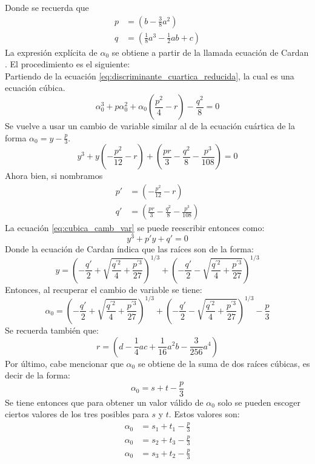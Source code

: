 \documentclass[12pt]{article}
\begin{document}
Donde se recuerda que 
\begin{align}
\label{eq:valores_p_cuartica}
p&=\left(b-\frac{3}{8}a^2\right)\\
\label{eq:valores_q_cuartica}
q&=\left(\frac{1}{8}a^3 - \frac{1}{2}ab + c \right)
\end{align}
La expresión explícita de $\alpha_0$ se obtiene a partir de la llamada ecuación de Cardan \cite{higheralgebra}. El procedimiento es el siguiente:\\
Partiendo de la ecuación \ref{eq:discriminante_cuartica_reducida}, la cual es una ecuación cúbica.
\begin{equation}
\alpha_0^3 + p\alpha_0^2+ \alpha_0 \left(\frac{p^2}{4}-r\right) - \frac{q^2}{8}=0
\end{equation}
Se vuelve a usar un cambio de variable similar al de la ecuación cuártica de la forma $\alpha_0 = y- \frac{p}{3}$.
\begin{equation}
\label{eq:cubica_camb_var}
y^3 +y\left(-\frac{p^2}{12}-r\right) + \left(\frac{pr}{3}-\frac{q^2}{8}-\frac{p^3}{108}\right)=0
\end{equation}
Ahora bien, si nombramos
\begin{align}
\label{eq:pp_alpha}
p'&=\left(-\frac{p^2}{12}-r\right)\\
\label{eq:qp_alpha}
q'&=\left(\frac{pr}{3}-\frac{q^2}{8}-\frac{p^3}{108}\right)
\end{align}
La ecuación \ref{eq:cubica_camb_var} se puede reescribir entonces como:
\begin{equation}
\label{eq:cub_red}
y^3 +p'y+q'=0
\end{equation}
Donde la ecuación de Cardan \cite{higheralgebra} índica que las raíces son de la forma:
\begin{equation}
y = \left(-\frac{q'}{2} + \sqrt{\frac{q^{'2}}{4}+\frac{p^{'3}}{27}}\right)^{1/3} + \left(-\frac{q'}{2} - \sqrt{\frac{q^{'2}}{4}+\frac{p^{'3}}{27}}\right)^{1/3}
\end{equation}
Entonces, al recuperar el cambio de variable se tiene:
\begin{equation}
\label{eq:alpha_cero}
\alpha_0 = \left(-\frac{q'}{2} + \sqrt{\frac{q^{'2}}{4}+\frac{p^{'3}}{27}}\right)^{1/3} + \left(-\frac{q'}{2} - \sqrt{\frac{q^{'2}}{4}+\frac{p^{'3}}{27}}\right)^{1/3} - \frac{p}{3}
\end{equation}
Se recuerda también que:
\begin{equation}
r= \left(d-\frac{1}{4}ac +\frac{1}{16}a^2b-\frac{3}{256}a^4\right)
\end{equation}
Por último, cabe mencionar que $\alpha_0$ se obtiene de la suma de dos raíces cúbicas, es decir de la forma:
\begin{equation}
\alpha_0 = s +t - \frac{p}{3}
\end{equation}
Se tiene entonces que para obtener un valor válido de $\alpha_0$ solo se pueden escoger ciertos valores de los tres posibles para $s$ y $t$. Estos valores son:
\begin{align}
\label{eq:raices_permitidas_para_aplha}
\alpha_0&=s_1+t_1- \frac{p}{3}\\
\alpha_0&=s_2+t_3- \frac{p}{3}\\
\alpha_0&=s_3+t_2- \frac{p}{3}
\end{align}
\end{document}

